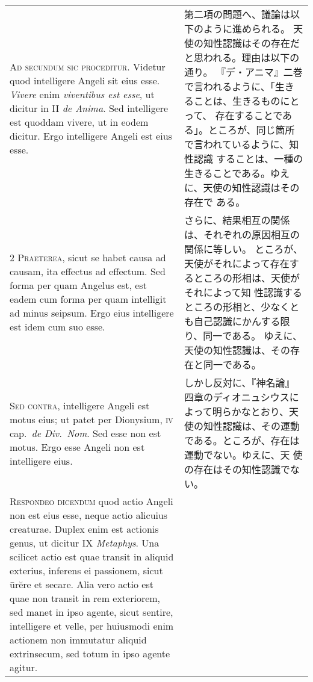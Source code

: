 \documentclass[10pt]{jsarticle} %
\begin{document}
\begin{longtable}{p{21em}p{21em}}

{\huge A}{\scshape d secundum sic proceditur}. Videtur quod intelligere
Angeli sit eius esse. {\itshape Vivere} enim {\itshape viventibus est
esse}, ut dicitur in II {\itshape de Anima}. Sed intelligere est quoddam
vivere, ut in eodem dicitur. Ergo intelligere Angeli est eius esse.


&

第二項の問題へ、議論は以下のように進められる。
天使の知性認識はその存在だと思われる。理由は以下の通り。
『デ・アニマ』二巻で言われるように、「生きることは、生きるものにとって、
 存在することである」。ところが、同じ箇所で言われているように、知性認識
 することは、一種の生きることである。ゆえに、天使の知性認識はその存在で
 ある。

\\


{\scshape 2 Praeterea}, sicut se habet causa ad causam,
ita effectus ad effectum. Sed forma per quam Angelus est, est eadem cum
forma per quam intelligit ad minus seipsum. Ergo eius intelligere est
idem cum suo esse.


&

さらに、結果相互の関係は、それぞれの原因相互の関係に等しい。
ところが、天使がそれによって存在するところの形相は、天使がそれによって知
 性認識するところの形相と、少なくとも自己認識にかんする限り、同一である。
 ゆえに、天使の知性認識は、その存在と同一である。

\\


{\scshape Sed contra}, intelligere Angeli est motus eius; ut patet per
Dionysium, {\scshape iv} cap.~{\itshape de Div.~Nom}. Sed esse non est
motus. Ergo esse Angeli non est intelligere eius.


&

しかし反対に、『神名論』四章のディオニュシウスによって明らかなとおり、天
 使の知性認識は、その運動である。ところが、存在は運動でない。ゆえに、天
 使の存在はその知性認識でない。

\\


{\scshape Respondeo dicendum} quod actio Angeli non est
eius esse, neque actio alicuius creaturae. Duplex enim est actionis
genus, ut dicitur IX {\itshape Metaphys}. Una scilicet actio est quae transit in
aliquid exterius, inferens ei passionem, sicut \={u}r\u{e}re et secare. Alia
vero actio est quae non transit in rem exteriorem, sed manet in ipso
agente, sicut sentire, intelligere et velle, per huiusmodi enim actionem
non immutatur aliquid extrinsecum, sed totum in ipso agente agitur. 



\end{longtable}
\end{document}
